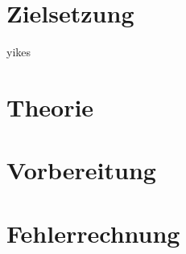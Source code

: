 


\section{Zielsetzung}
yikes
\label{sec:Theorie}

\section{Theorie}

\section{Vorbereitung}

\section{Fehlerrechnung}

